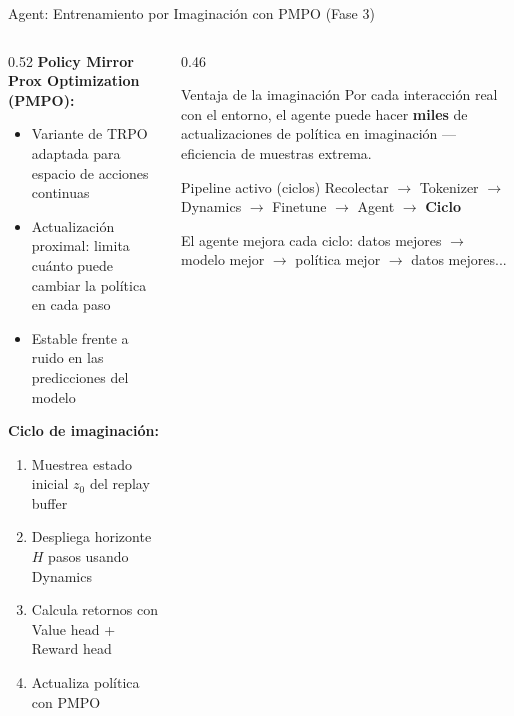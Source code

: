 \documentclass[aspectratio=169, 12pt]{beamer}
\begin{document}
\begin{frame}{Agent: Entrenamiento por Imaginación con PMPO (Fase 3)}
\begin{columns}[T]
  \begin{column}{0.52\textwidth}
    \textbf{Policy Mirror Prox Optimization (PMPO):}
    \begin{itemize}
      \item Variante de TRPO adaptada para espacio de acciones continuas
      \item Actualización proximal: limita cuánto puede cambiar la política en cada paso
      \item Estable frente a ruido en las predicciones del modelo
    \end{itemize}

    \vspace{8pt}
    \textbf{Ciclo de imaginación:}
    \begin{enumerate}\small
      \item Muestrea estado inicial $z_0$ del replay buffer
      \item Despliega horizonte $H$ pasos usando Dynamics
      \item Calcula retornos con Value head + Reward head
      \item Actualiza política con PMPO
    \end{enumerate}
  \end{column}
  \begin{column}{0.46\textwidth}
    \begin{exampleblock}{Ventaja de la imaginación}
      Por cada interacción real con el entorno, el agente puede hacer \textbf{miles} de actualizaciones de política en imaginación — eficiencia de muestras extrema.
    \end{exampleblock}

    \vspace{8pt}
    \begin{block}{Pipeline activo (ciclos)}
      \centering
      \small
      Recolectar $\xrightarrow{}$ Tokenizer $\xrightarrow{}$ Dynamics $\xrightarrow{}$ Finetune $\xrightarrow{}$ Agent $\xrightarrow{}$ \textbf{Ciclo}
      \vspace{4pt}

      El agente mejora cada ciclo: datos mejores $\to$ modelo mejor $\to$ política mejor $\to$ datos mejores...
    \end{block}
  \end{column}
\end{columns}
\end{frame}
\end{document}
